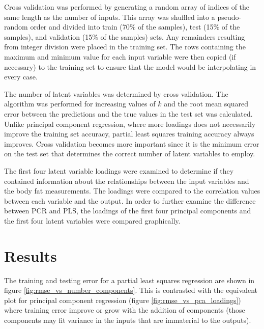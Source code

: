 \documentclass{IEEEtran}
\begin{document}
Cross validation was performed by generating a random array of indices of the same length as the number of inputs. This array was shuffled into a pseudo-random order and divided into train (70\% of the samples), test (15\% of the samples), and validation (15\% of the samples) sets. Any remainders resulting from integer division were placed in the training set. The rows containing the maximum and minimum value for each input variable were then copied (if necessary) to the training set to ensure that the model would be interpolating in every case.

The number of latent variables was determined by cross validation. The algorithm was performed for increasing values of $k$ and the root mean squared error between the predictions and the true values in the test set was calculated. Unlike principal component regression, where more loadings does not necessarily improve the training set accuracy, partial least squares training accuracy always improves. Cross validation becomes more important since it is the minimum error on the test set that determines the correct number of latent variables to employ.

The first four latent variable loadings were examined to determine if they contained information about the relationships between the input variables and the body fat measurements. The loadings were compared to the correlation values between each variable and the output. In order to further examine the difference between PCR and PLS, the loadings of the first four principal components and the first four latent variables were compared graphically.

\section{Results}

The training and testing error for a partial least squares regression are shown in figure \ref{fig:rmse_vs_number_components}. This is contrasted with the equivalent plot for principal component regression (figure \ref{fig:rmse_vs_pca_loadings}) where training error improve or grow with the addition of components (those components may fit variance in the inputs that are immaterial to the outputs).
\end{document}
